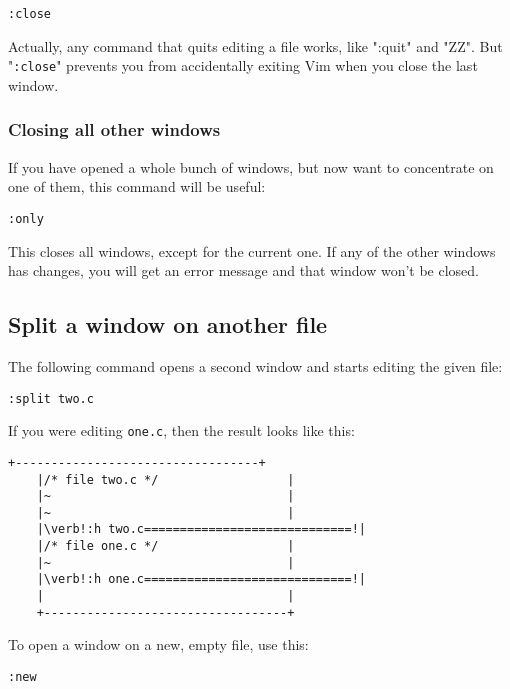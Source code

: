  \begin{Verbatim}[samepage=true]
 :close
 \end{Verbatim}

Actually, any command that quits editing a file works, like ":quit" and "ZZ".
But "\verb!:close!" prevents you from accidentally exiting Vim when you close the last window.

\subsubsection{Closing all other windows}

If you have opened a whole bunch of windows, but now want to concentrate on one of them, this command will be useful:

 \begin{Verbatim}[samepage=true]
 :only
 \end{Verbatim}

This closes all windows, except for the current one.
If any of the other windows has changes, you will get an error message and that window won't be closed.

\subsection{Split a window on another file}
The following command opens a second window and starts editing the given file:

 \begin{Verbatim}[samepage=true]
 :split two.c
 \end{Verbatim}

If you were editing \verb!one.c!, then the result looks like this:

\begin{Verbatim}[samepage=true]
    +----------------------------------+
    |/* file two.c */                  |
    |~                                 |
    |~                                 |
    |\verb!:h two.c=============================!|
    |/* file one.c */                  |
    |~                                 |
    |\verb!:h one.c=============================!|
    |                                  |
    +----------------------------------+
\end{Verbatim}

To open a window on a new, empty file, use this:

 \begin{Verbatim}[samepage=true]
 :new
 \end{Verbatim}

